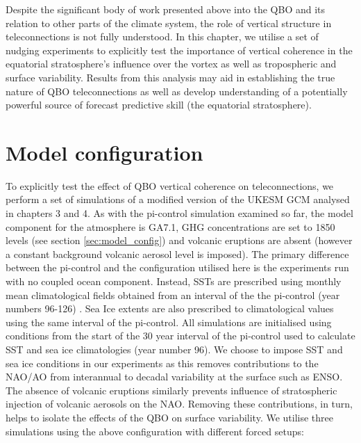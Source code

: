 Despite the significant body of work presented above into the QBO and its relation to other parts of the climate system, the role of vertical structure in teleconnections is not fully understood. In this chapter, we utilise a set of nudging experiments to explicitly test the importance of vertical coherence in the equatorial stratosphere's influence over the vortex as well as tropospheric and surface variability. Results from this analysis may aid in establishing the true nature of QBO teleconnections as well as develop understanding of a potentially powerful source of forecast predictive skill (the equatorial stratosphere).

\section{Model configuration}

To explicitly test the effect of QBO vertical coherence on teleconnections, we perform a set of simulations of a modified version of the UKESM GCM analysed in chapters 3 and 4. As with the pi-control simulation examined so far, the model component for the atmosphere is GA7.1, GHG concentrations are set to 1850 levels (see section \ref{sec:model_config}) and volcanic eruptions are absent (however a constant background volcanic aerosol level is imposed). The primary difference between the pi-control and the configuration utilised here is the experiments run with no coupled ocean component. Instead, SSTs are prescribed using monthly mean climatological fields obtained from an interval of the the pi-control (year numbers 96-126) \citep{oconnorAssessment2021b}. Sea Ice extents are also prescribed to climatological values using the same interval of the pi-control. All simulations are initialised using conditions from the start of the 30 year interval of the pi-control used to calculate SST and sea ice climatologies (year number 96). We choose to impose SST and sea ice conditions in our experiments as this removes contributions to the NAO/AO from interannual to decadal variability at the surface such as ENSO. The absence of volcanic eruptions similarly prevents influence of stratospheric injection of volcanic aerosols on the NAO. Removing these contributions, in turn, helps to isolate the effects of the QBO on surface variability. We utilise three simulations using the above configuration with different forced setups:


